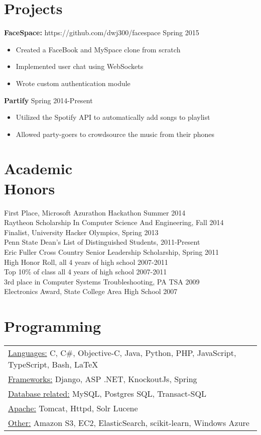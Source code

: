 \documentclass[margin]{res}
\begin{document}
\begin{resume}
\section{Projects}
{\bf FaceSpace:} https://github.com/dwj300/facespace \hfill Spring 2015
\begin{itemize} \itemsep -2pt %
\item Created a FaceBook and MySpace clone from scratch
\item Implemented user chat using WebSockets
\item Wrote custom authentication module
\end{itemize}
{\bf Partify} \hfill Spring 2014-Present
\begin{itemize} \itemsep -2pt %
\item Utilized the Spotify API to automatically add songs to playlist
\item Allowed party-goers to crowdsource the music from their phones
\end{itemize}
\section{Academic \\ Honors}
First Place, Microsoft Azurathon Hackathon \hfill Summer 2014\\
Raytheon Scholarship In Computer Science And Engineering, \hfill Fall 2014\\
Finalist, University Hacker Olympics, \hfill Spring 2013\\
Penn State Dean's List of Distinguished Students, \hfill 2011-Present \\
Eric Fuller Cross Country Senior Leadership Scholarship, \hfill Spring 2011 \\
High Honor Roll, all 4 years of high school \hfill 2007-2011 \\
Top 10\% of class all 4 years of high school \hfill 2007-2011 \\
3rd place in Computer Systems Troubleshooting, PA TSA \hfill 2009 \\
Electronics Award, State College Area High School \hfill 2007

\section{Programming}
\begin{tabular}{l} 
\underline{Languages:} C, C\#, Objective-C, Java, Python, PHP, JavaScript, TypeScript, Bash, LaTeX \\
\underline{Frameworks:} Django, ASP .NET, KnockoutJs, Spring \\
\underline{Database related:} MySQL, Postgres SQL, Transact-SQL \\
\underline{Apache:} Tomcat, Httpd, Solr Lucene \\
\underline{Other:} Amazon S3, EC2, ElasticSearch, scikit-learn, Windows Azure
\end{tabular}
\end{resume}
\end{document}
